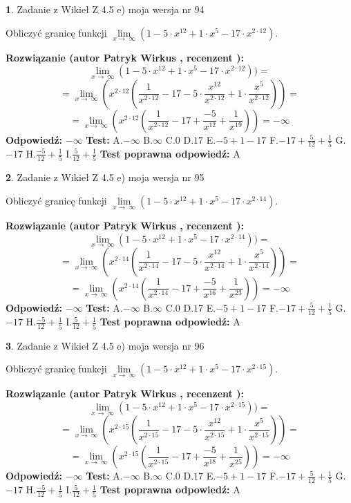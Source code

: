 \documentclass[12pt, a4paper]{article}
\theoremstyle{definition} %
\newtheorem{zad}{}
\newcommand{\zadStart}[1]{\begin{zad}#1\newline}
\newcommand{\zadStop}{\end{zad}}
\newcommand{\rozwStart}[2]{\noindent \textbf{Rozwiązanie (autor #1 , recenzent #2): }\newline}
\newcommand{\rozwStop}{\newline}
\newcommand{\odpStart}{\noindent \textbf{Odpowiedź:}\newline}
\newcommand{\odpStop}{\newline}
\newcommand{\testStart}{\noindent \textbf{Test:}\newline}
\newcommand{\testStop}{\newline}
\newcommand{\kluczStart}{\noindent \textbf{Test poprawna odpowiedź:}\newline}
\newcommand{\kluczStop}{\newline}
\begin{document}
\zadStart{Zadanie z Wikieł Z 4.5 e) moja wersja nr 94}



Obliczyć granicę funkcji  $\lim\limits_{x\to\ \infty}(1 - 5 \cdot x^{12}+1 \cdot x^{5}- 17 \cdot x^{2\cdot12})$.
\zadStop
\rozwStart{Patryk Wirkus}{}
$$\lim\limits_{x\to\ \infty}(1 - 5 \cdot x^{12}+1 \cdot x^{5}- 17 \cdot x^{2\cdot12}))=$$
$$=\lim\limits_{x\to\ \infty}(x^{2\cdot12}(\frac{1}{x^{2\cdot12}}-17 -5 \cdot \frac{x^{12}}{x^{2\cdot12}}+1 \cdot \frac{x^{5}}{x^{2\cdot12}}))=$$
$$=\lim\limits_{x\to\ \infty}(x^{2\cdot12}(\frac{1}{x^{2\cdot12}}-17 + \frac{-5}{x^{12}}+ \frac{1}{x^{19}}))=-\infty$$
\rozwStop
\odpStart
$-\infty$
\odpStop
\testStart
A.$-\infty$ B.$\infty$ C.$0$ D.$17$ E.$-5 + 1 - 17$
F.$-17+\frac{5}{12}+\frac{1}{5}$ G.$-17$
H.$\frac{-5}{12}+\frac{1}{5}$
I.$\frac{5}{12}+\frac{1}{5}$
\testStop
\kluczStart
A
\kluczStop



\zadStart{Zadanie z Wikieł Z 4.5 e) moja wersja nr 95}



Obliczyć granicę funkcji  $\lim\limits_{x\to\ \infty}(1 - 5 \cdot x^{12}+1 \cdot x^{5}- 17 \cdot x^{2\cdot14})$.
\zadStop
\rozwStart{Patryk Wirkus}{}
$$\lim\limits_{x\to\ \infty}(1 - 5 \cdot x^{12}+1 \cdot x^{5}- 17 \cdot x^{2\cdot14}))=$$
$$=\lim\limits_{x\to\ \infty}(x^{2\cdot14}(\frac{1}{x^{2\cdot14}}-17 -5 \cdot \frac{x^{12}}{x^{2\cdot14}}+1 \cdot \frac{x^{5}}{x^{2\cdot14}}))=$$
$$=\lim\limits_{x\to\ \infty}(x^{2\cdot14}(\frac{1}{x^{2\cdot14}}-17 + \frac{-5}{x^{16}}+ \frac{1}{x^{23}}))=-\infty$$
\rozwStop
\odpStart
$-\infty$
\odpStop
\testStart
A.$-\infty$ B.$\infty$ C.$0$ D.$17$ E.$-5 + 1 - 17$
F.$-17+\frac{5}{12}+\frac{1}{5}$ G.$-17$
H.$\frac{-5}{12}+\frac{1}{5}$
I.$\frac{5}{12}+\frac{1}{5}$
\testStop
\kluczStart
A
\kluczStop



\zadStart{Zadanie z Wikieł Z 4.5 e) moja wersja nr 96}



Obliczyć granicę funkcji  $\lim\limits_{x\to\ \infty}(1 - 5 \cdot x^{12}+1 \cdot x^{5}- 17 \cdot x^{2\cdot15})$.
\zadStop
\rozwStart{Patryk Wirkus}{}
$$\lim\limits_{x\to\ \infty}(1 - 5 \cdot x^{12}+1 \cdot x^{5}- 17 \cdot x^{2\cdot15}))=$$
$$=\lim\limits_{x\to\ \infty}(x^{2\cdot15}(\frac{1}{x^{2\cdot15}}-17 -5 \cdot \frac{x^{12}}{x^{2\cdot15}}+1 \cdot \frac{x^{5}}{x^{2\cdot15}}))=$$
$$=\lim\limits_{x\to\ \infty}(x^{2\cdot15}(\frac{1}{x^{2\cdot15}}-17 + \frac{-5}{x^{18}}+ \frac{1}{x^{25}}))=-\infty$$
\rozwStop
\odpStart
$-\infty$
\odpStop
\testStart
A.$-\infty$ B.$\infty$ C.$0$ D.$17$ E.$-5 + 1 - 17$
F.$-17+\frac{5}{12}+\frac{1}{5}$ G.$-17$
H.$\frac{-5}{12}+\frac{1}{5}$
I.$\frac{5}{12}+\frac{1}{5}$
\testStop
\kluczStart
A
\kluczStop
\end{document}
